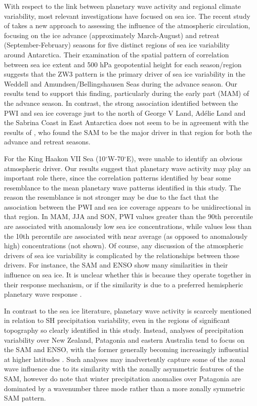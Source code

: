 With respect to the link between planetary wave activity and regional climate variability, most relevant investigations have focused on sea ice. The recent study of \citet{Raphael2014} takes a new approach to assessing the influence of the atmospheric circulation, focusing on the ice advance (approximately March-August) and retreat (September-February) seasons for five distinct regions of sea ice variability around Antarctica. Their examination of the spatial pattern of correlation between sea ice extent and 500 hPa geopotential height for each season/region suggests that the ZW3 pattern is the primary driver of sea ice variability in the Weddell and Amundsen/Bellingshausen Seas during the advance season. Our results tend to support this finding, particularly during the early part (MAM) of the advance season. In contrast, the strong association identified between the PWI and sea ice coverage just to the north of George V Land, Ad{\'e}lie Land and the Sabrina Coast in East Antarctica does not seem to be in agreement with the results of \citet{Raphael2014}, who found the SAM to be the major driver in that region for both the advance and retreat seasons.

For the King Haakon VII Sea (10$^{\circ}$W-70$^{\circ}$E), \citet{Raphael2014} were unable to identify an obvious atmospheric driver. Our results suggest that planetary wave activity may play an important role there, since the correlation patterns identified by \citet{Raphael2014} bear some resemblance to the mean planetary wave patterns identified in this study. The reason the resemblance is not stronger may be due to the fact that the association between the PWI and sea ice coverage appears to be unidirectional in that region. In MAM, JJA and SON, PWI values greater than the 90th percentile are associated with anomalously low sea ice concentrations, while values less than the 10th percentile are associated with near average (as opposed to anomalously high) concentrations (not shown). Of course, any discussion of the atmospheric drivers of sea ice variability is complicated by the relationships between those drivers. For instance, the SAM and ENSO show many similarities in their influence on sea ice. It is unclear whether this is because they operate together in their response mechanism, or if the similarity is due to a preferred hemispheric planetary wave response \citep[e.g.][]{Pezza2012}. 

In contrast to the sea ice literature, planetary wave activity is scarcely mentioned in relation to SH precipitation variability, even in the regions of significant topography so clearly identified in this study. Instead, analyses of precipitation variability over New Zealand, Patagonia and eastern Australia tend to focus on the SAM and ENSO, with the former generally becoming increasingly influential at higher latitudes \citep[e.g.][]{Ummenhofer2007,Aravena2009,Kidston2009,Risbey2009,Garreaud2013,Jiang2013}. Such analyses may inadvertently capture some of the zonal wave influence due to its similarity with the zonally asymmetric features of the SAM, however \citet{Garreaud2013} do note that winter precipitation anomalies over Patagonia are dominated by a wavenumber three mode rather than a more zonally symmetric SAM pattern.

